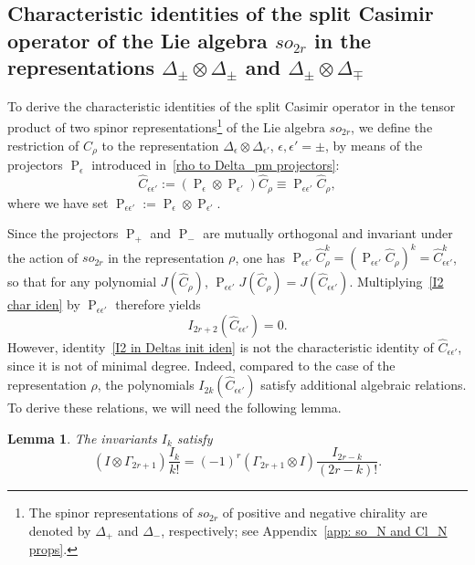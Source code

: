 \documentclass[a4paper]{article}
\newcommand{\hC}{\widehat{C}}
\renewcommand{\=}{\ =\ }
\DeclareMathOperator{\proj}{P}
\numberwithin{equation}{section}
\newtheorem{lemma}{Lemma}
\theoremstyle{remark}
\begin{document}
\subsection{Characteristic identities of the split Casimir operator of the Lie algebra $so_{2r}$ in the representations $\Delta_{\pm}\otimes \Delta_{\pm}$ and $\Delta_{\pm}\otimes \Delta_{\mp}$}

To derive the characteristic identities of the split Casimir operator in the tensor product of two spinor representations\footnote{The spinor representations of $so_{2r}$ of positive and negative chirality are denoted by $\Delta_+$ and $\Delta_-$, respectively; see Appendix~\ref{app: so_N and Cl_N props}.}
of the Lie algebra $so_{2r}$, we define the restriction of $\hC_\rho$ to the representation
$\Delta_{\epsilon}\otimes \Delta_{\epsilon'}$, $\epsilon,\epsilon'=\pm$,
by means of the projectors $\proj_\epsilon$ introduced in~\eqref{rho to Delta_pm projectors}:
\begin{equation}\label{hC_epsilon epsilon' def}
\hC_{\epsilon\epsilon'}:=
(\proj_\epsilon\otimes \proj_{\epsilon'})\hC_\rho
\equiv
\proj_{\epsilon\epsilon'}\hC_\rho,
\end{equation}
where we have set $\proj_{\epsilon\epsilon'}:=\proj_\epsilon\otimes \proj_{\epsilon'}$.

Since the projectors $\proj_+$ and $\proj_-$ are mutually orthogonal and invariant under the action of $so_{2r}$ in the representation $\rho$, one has $\proj_{\epsilon\epsilon'}\hC_\rho^k = (\proj_{\epsilon\epsilon'}\hC_\rho)^k = \hC_{\epsilon\epsilon'}^k$, so that for any polynomial $J(\hC_\rho)$, $\proj_{\epsilon\epsilon'} J(\hC_\rho) = J(\hC_{\epsilon\epsilon'})$. Multiplying~\eqref{I2 char iden} by $\proj_{\epsilon\epsilon'}$ therefore yields
\begin{equation}\label{I2 in Deltas init iden}
I_{2r+2}(\hC_{\epsilon\epsilon'})=0.
\end{equation}
However, identity~\eqref{I2 in Deltas init iden} is not the characteristic identity of $\hC_{\epsilon\epsilon'}$, since it is not of minimal degree. Indeed, compared to the case of the representation $\rho$, the polynomials $I_{2k}(\hC_{\epsilon\epsilon'})$ satisfy additional algebraic relations. To derive these relations, we will need the following lemma.

\begin{lemma}\label{Lemma 1}
The invariants $I_k$ satisfy
\begin{equation}\label{(I otimes Gamma)I_k}
(I\otimes \Gamma_{2r+1})\frac{I_k}{k!}
=
(-1)^r(\Gamma_{2r+1}\otimes I)
\frac{I_{2r-k}}{(2r-k)!}.
\end{equation}
\end{lemma}
\end{document}
